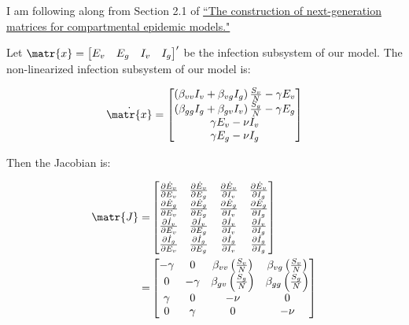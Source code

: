 \documentclass[11pt]{article}
\begin{document}
I am following along from Section 2.1 of \href{https://paperpile.com/app/p/3ac94d2d-a793-030e-b8a5-93733f228342}{``The construction of next-generation matrices for compartmental epidemic models."}

Let \( \matr{x} = \begin{bmatrix} E_v & E_g & I_v & I_g \end{bmatrix}^\prime \) be the infection subsystem of our model.
The non-linearized infection subsystem of our model is:

\[
	\dot{\matr{x}}	=
	\begin{bmatrix}
		\left(\beta_{vv} I_v + \beta_{vg} I_g \right) \frac{S_v}{N} - \gamma E_v\\
		\left(\beta_{gg} I_g + \beta_{gv} I_v \right) \frac{S_g}{N} - \gamma E_g \\
		\gamma E_v - \nu I_v \\
		\gamma E_g - \nu I_g \\
	\end{bmatrix}
\]

Then the Jacobian is:


\begin{align*}
	\matr{J} =&
	\begin{bmatrix}
		\frac{\partial \dot{E}_v}{\partial E_v} & 	\frac{\partial \dot{E}_v}{\partial E_g} & 	\frac{\partial \dot{E}_v}{\partial I_v} & 	\frac{\partial \dot{E}_v}{\partial I_g} \\
		\frac{\partial \dot{E}_g}{\partial E_v} & 	\frac{\partial \dot{E}_g}{\partial E_g} & 	\frac{\partial \dot{E}_g}{\partial I_v} & 	\frac{\partial \dot{E}_g}{\partial I_g}\\
		\frac{\partial \dot{I}_v}{\partial E_v} & 	\frac{\partial \dot{I}_v}{\partial E_g} & 	\frac{\partial \dot{I}_v}{\partial I_v} & 	\frac{\partial \dot{I}_v}{\partial I_g}\\
		\frac{\partial \dot{I}_g}{\partial E_v} & 	\frac{\partial \dot{I}_g}{\partial E_g} & 	\frac{\partial \dot{I}_g}{\partial I_v} & 	\frac{\partial \dot{I}_g}{\partial I_g}\\
	 \end{bmatrix}\\
	 =&
	\begin{bmatrix}
		-\gamma	& 0	&	\beta_{vv} \left( \frac{S_v}{N} \right)	&	\beta_{vg} \left( \frac{S_v}{N} \right)	\\
		0	&	-\gamma	&	\beta_{gv} \left( \frac{S_g}{N} \right)	&	\beta_{gg} \left( \frac{S_g}{N} \right)	\\
		\gamma	&	0	&	-\nu		&	0	\\
		0	&	\gamma	&	0	&	-\nu
	 \end{bmatrix}
\end{align*}
\end{document}
